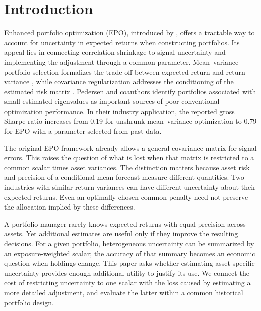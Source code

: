 \section{Introduction}
Enhanced portfolio optimization (EPO), introduced by \citet{pedersen2021}, offers a tractable way to account for uncertainty in expected returns when constructing portfolios. Its appeal lies in connecting correlation shrinkage to signal uncertainty and implementing the adjustment through a common parameter. Mean--variance portfolio selection formalizes the trade-off between expected return and return variance \citep{markowitz1952}, while covariance regularization addresses the conditioning of the estimated risk matrix \citep{ledoit2004}. Pedersen and coauthors identify portfolios associated with small estimated eigenvalues as important sources of poor conventional optimization performance. In their industry application, the reported gross Sharpe ratio increases from 0.19 for unshrunk mean--variance optimization to 0.79 for EPO with a parameter selected from past data.

The original EPO framework already allows a general covariance matrix for signal errors. This raises the question of what is lost when that matrix is restricted to a common scalar times asset variances. The distinction matters because asset risk and precision of a conditional-mean forecast measure different quantities. Two industries with similar return variances can have different uncertainty about their expected returns. Even an optimally chosen common penalty need not preserve the allocation implied by these differences.

A portfolio manager rarely knows expected returns with equal precision across assets. Yet additional estimates are useful only if they improve the resulting decisions. For a given portfolio, heterogeneous uncertainty can be summarized by an exposure-weighted scalar; the accuracy of that summary becomes an economic question when holdings change. This paper asks whether estimating asset-specific uncertainty provides enough additional utility to justify its use. We connect the cost of restricting uncertainty to one scalar with the loss caused by estimating a more detailed adjustment, and evaluate the latter within a common historical portfolio design.

